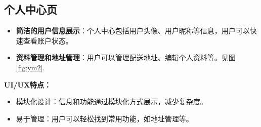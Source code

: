 \subsection{个人中心页}
\begin{itemize}
    \item \textbf{简洁的用户信息展示}：个人中心包括用户头像、用户昵称等信息，用户可以快速查看账户状态。
    \item \textbf{资料管理和地址管理}：用户可以管理配送地址、编辑个人资料等。见图\ref{fig:ym2}.


\end{itemize}
\textbf{ UI/UX特点：}
\begin{itemize}
    \item 模块化设计：信息和功能通过模块化方式展示，减少复杂度。
    \item 易于管理：用户可以轻松找到常用功能，如地址管理等。
\end{itemize}

